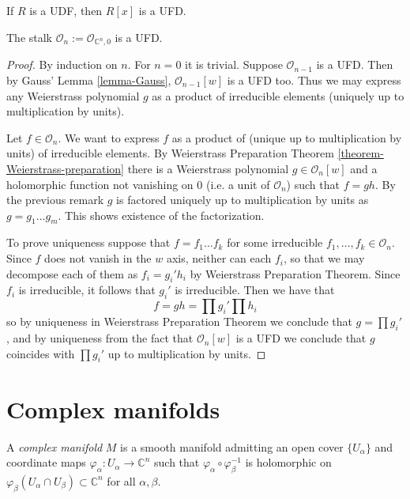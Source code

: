 \begin{lemma}
\label{lemma-Gauss-UFD}
If $R$ is a UDF, then $R[x]$ is a UFD.
\end{lemma}

\begin{lemma}
\label{lemma-stalk-is-UFD}
The stalk $\mathcal{O}_n:=\mathcal{O}_{\mathbb{C}^n,0}$ is a UFD.
\end{lemma}

\begin{proof}
By induction on $n$. For $n=0$ it is trivial. Suppose $\mathcal{O}_{n-1}$ is a
UFD. Then by Gauss' Lemma \ref{lemma-Gauss}, $\mathcal{O}_{n-1}[w]$ is a UFD
too. Thus we may express any Weierstrass polynomial $g$ as a product of
irreducible elements (uniquely up to multiplication by units).

Let $f\in \mathcal{O}_n$. We want to express $f$ as a product of (unique up to
multiplication by units) of irreducible elements. By Weierstrass Preparation
Theorem \ref{theorem-Weierstrass-preparation} there is a Weierstrass polynomial
$g\in\mathcal{O}_n[w]$ and a holomorphic function not vanishing on $0$ (i.e. a
unit of $\mathcal{O}_n$) such that $f=gh$. By the previous remark $g$ is
factored uniquely up to multiplication by units as $g=g_1\ldots g_m$. This shows
existence of the factorization.

To prove uniqueness suppose that $f=f_1\ldots f_k$ for some irreducible
$f_1,\ldots,f_k\in\mathcal{O}_n$. Since $f$ does not vanish in the $w$ axis,
neither can each $f_i$, so that we may decompose each of them as  $f_i=g_i'h_i$
by Weierstrass Preparation Theorem. Since $f_i$ is irreducible, it follows that
$g_i'$ is irreducible. Then we have that $$ f=gh=\prod g_i'\prod h_i $$ so by
uniqueness in Weierstrass Preparation Theorem we conclude that $g=\prod g_i'$,
and by uniqueness from the fact that  $\mathcal{O}_n[w]$ is a UFD we conclude
that $g$ coincides with $\prod g_i'$ up to multiplication by units.
\end{proof}

\section{Complex manifolds}
\label{section-complex-manifolds}

\begin{definition}
\label{definition-complex-manifold}
A {\it complex manifold} $M$ is a smooth manifold admitting an open cover
$\{U_\alpha\}$ and coordinate maps $\varphi_\alpha:U_\alpha\to\mathbb{C}^n$ such
that $\varphi_\alpha\circ\varphi_\beta^{-1}$ is holomorphic on
$\varphi_\beta(U_\alpha\cap U_\beta)\subset\mathbb{C}^n$ for all $\alpha,\beta$.
\end{definition}

